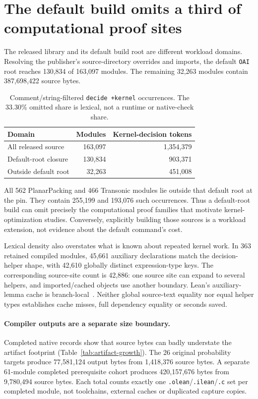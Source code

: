\documentclass[10pt,twocolumn]{article}
\begin{document}
\section{The default build omits a third of computational proof sites}
\label{sec:scope}
The released library and its default build root are different workload
domains. Resolving the publisher's source-directory overrides and imports,
the default \texttt{OAI} root reaches 130,834 of 163,097 modules.
The remaining 32,263 modules contain 387,698,422 source bytes.

\begin{table}[t]
\centering\small
\begin{tabular}{@{}lrr@{}}
\toprule
Domain & Modules & Kernel-decision tokens\\
\midrule
All released source &163,097&1,354,379\\
Default-root closure &130,834&903,371\\
Outside default root &32,263&451,008\\
\bottomrule
\end{tabular}
\caption{Comment/string-filtered \texttt{decide +kernel} occurrences.
The 33.30\% omitted share is lexical, not a runtime or native-check share.}
\label{tab:build-domain}
\end{table}

All 562 PlanarPacking and 466 Transonic modules lie outside that default
root at the pin. They contain 255,199 and 193,076 such occurrences.
Thus a default-root build can omit precisely the computational proof
families that motivate kernel-optimization studies.
Conversely, explicitly building those sources is a workload extension,
not evidence about the default command's cost.

Lexical density also overstates what is known about repeated kernel work.
In 363 retained compiled modules, 45,661 auxiliary declarations match the
decision-helper shape, with 42,610 globally distinct expression-type keys.
The corresponding source-site count is 42,886: one source site can expand
to several helpers, and imported/cached objects use another boundary.
Lean's auxiliary-lemma cache is branch-local~\cite{leanDecide434,leanAuxLemma434}.
Neither global source-text equality nor equal helper types establishes
cache misses, full dependency equality or seconds saved.

\paragraph{Compiler outputs are a separate size boundary.}
Completed native records show that source bytes can badly understate the
artifact footprint (Table~\ref{tab:artifact-growth}).
The 26 original probability targets produce 77,581,124 output bytes from
1,418,376 source bytes. A separate 61-module completed prerequisite cohort
produces 420,157,676 bytes from 9,780,494 source bytes.
Each total counts exactly one \texttt{.olean}/\texttt{.ilean}/\texttt{.c}
set per completed module, not toolchains, external caches or duplicated
capture copies.
\end{document}
